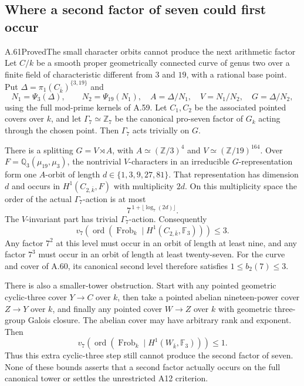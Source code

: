 \subsection{Where a second factor of seven could first occur}

\begin{claim}{A.61}{Proved}{The small character orbits cannot produce the next arithmetic factor}
Let $C/k$ be a smooth proper geometrically connected curve
of genus two over a finite field of characteristic different
from $3$ and $19$, with a rational base point.  Put
$\Delta=\pi_1(C_{\bar k})^{\{3,19\}}$ and
\[
 N_1=\Psi_3(\Delta),\qquad N_2=\Psi_{19}(N_1),
 \quad A=\Delta/N_1,\quad V=N_1/N_2,
 \quad G=\Delta/N_2,
\]
using the full mod-prime kernels of A.59.
Let $C_1,C_2$ be the associated pointed covers over $k$,
and let $\Gamma_7\simeq\mathbb Z_7$ be the canonical
pro-seven factor of $G_k$ acting through the chosen point.
Then $\Gamma_7$ acts trivially on $G$.

There is a splitting $G=V\rtimes A$, with
$A\simeq(\mathbb Z/3)^4$ and
$V\simeq(\mathbb Z/19)^{164}$.
Over $F=\mathbb Q_3(\mu_{19},\mu_3)$, the nontrivial
$V$-characters in an irreducible $G$-representation
form one $A$-orbit of length $d\in\{1,3,9,27,81\}$.
That representation has dimension $d$ and occurs in
$H^1(C_{2,\bar k},F)$ with multiplicity $2d$.
On this multiplicity space the order of the actual
$\Gamma_7$-action is at most
\[
                 7^{\,1+\lfloor\log_7(2d)\rfloor}.
                                                           \tag{A.61.1}
\]
The $V$-invariant part has trivial $\Gamma_7$-action.
Consequently
\[
 v_7\!\left(\operatorname{ord}
    (\operatorname{Frob}_k\mid H^1(C_{2,\bar k},\mathbb F_3))
          \right)\le3.                                   \tag{A.61.2}
\]
Any factor $7^2$ at this level must occur in an orbit
of length at least nine, and any factor $7^3$ must
occur in an orbit of length at least twenty-seven.
For the curve and cover of A.60, its canonical second
level therefore satisfies $1\le b_2(7)\le3$.

There is also a smaller-tower obstruction.  Start with
any pointed geometric cyclic-three cover $Y\to C$
over $k$, then take a pointed abelian nineteen-power
cover $Z\to Y$ over $k$, and finally any pointed
cover $W\to Z$ over $k$ with geometric three-group
Galois closure.  The abelian cover may have arbitrary
rank and exponent.  Then
\[
 v_7\!\left(\operatorname{ord}
    (\operatorname{Frob}_k\mid H^1(W_{\bar k},\mathbb F_3))
          \right)\le1.                                   \tag{A.61.3}
\]
Thus this extra cyclic-three step still cannot produce
the second factor of seven.  None of these bounds
asserts that a second factor actually occurs on the
full canonical tower or settles the unrestricted A12
criterion.
\end{claim}
